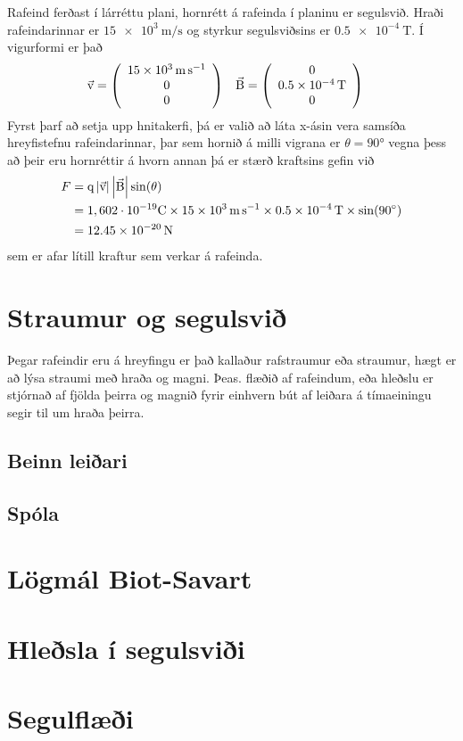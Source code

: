 \begin{formalexample}
	Rafeind ferðast í lárréttu plani, hornrétt á rafeinda í planinu er segulsvið.
	Hraði rafeindarinnar er $\SI{15e3}{\m\per\s}$ og styrkur segulsviðsins er
	$\SI{0.5e-4}{\tesla}$. Í vigurformi er það
	\begin{align*}
	\vec{\uspeed} &= 
		\left( 
		\begin{array}{c} 
			$\SI{15e3}{\m\per\s}$ \\
			$0$ \\
			$0$ \\
		\end{array} 
		\right)
	&
	\vec{\umfieldb} &= 
		\left( 
		\begin{array}{c} 
			0 \\
			$\SI{0.5e-4}{\tesla}$ \\
			0 \\
		\end{array} 
		\right)		
	\end{align*}
	\vspace{4 ex}
	Fyrst þarf að setja upp hnitakerfi, þá er valið að láta x-ásin vera samsíða
	hreyfistefnu rafeindarinnar, þar sem hornið á milli vigrana er $\theta = 
	\ang{90}$ vegna þess að þeir eru hornréttir á hvorn annan þá er
	stærð kraftsins gefin við
	\begin{align*}
		F 	&= 
			\uchargeq
			\left|  \vec{\uspeed}  \right| \left| \vec{\umfieldb} \right| 
				\sin(\theta) \\
			&= \uunitcharge \times \SI{15e3}{\m\per\s} \times \SI{0.5e-4}{\tesla} 
				\times \sin(\ang{90}) \\
			&= \SI{12.45e-20}{\N}
	\end{align*}
	sem er afar lítill kraftur sem verkar á rafeinda.
\end{formalexample}

\section{Straumur og segulsvið}
Þegar rafeindir eru á hreyfingu er það kallaður rafstraumur eða straumur,
hægt er að lýsa straumi með hraða og magni. Þeas. flæðið af rafeindum, eða
hleðslu er stjórnað af fjölda þeirra og magnið fyrir einhvern bút af leiðara á
tímaeiningu segir til um hraða þeirra.



\subsection{Beinn leiðari}

\subsection{Spóla}

\section{Lögmál Biot-Savart}

\section{Hleðsla í segulsviði}

\section{Segulflæði}


